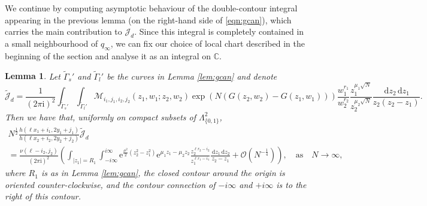 \documentclass[11pt]{article}
\theoremstyle{plain}
\newtheorem{lemma}[theorem]{Lemma}
\theoremstyle{definition}
\numberwithin{equation}{section}
\renewcommand{\d}{\,\mathrm{d}}
\renewcommand{\i}{\mathrm{i}}
\newcommand{\e}{\mathrm{e}}
\begin{document}
%
We continue by computing asymptotic behaviour of the double-contour integral appearing in the previous lemma (on the right-hand side of \eqref{eqn:gcan}), which carries the main contribution to $\mathcal{J}_d$. Since this integral is completely contained in a small neighbourhood of $q_{\infty}$, we can fix our choice of local chart described in the beginning of the section and analyse it as an integral on $\mathbb{C}$. 
%
\begin{lemma}\label{lem:Jdvalue}
Let $\widetilde{\Gamma}_s'$ and $\widetilde{\Gamma}_l'$ be the curves in Lemma \ref{lem:gcan} and denote
\begin{equation}
\mathcal{\widetilde{J}}_d=\frac{1}{(2\pi\i)^2}\int_{\tilde \Gamma_s'}\int_{\tilde \Gamma_l'}
\boldsymbol{\mathcal{M}}_{i_1,j_1,i_2,j_2}(z_1,w_1;z_2,w_2) 
\exp\left({N(G(z_2,w_2)-G(z_1,w_1))}\right)
\frac{w_1^{r_1}}{w_2^{r_2}}
 \frac{z_1^{\mu_1\sqrt{N}}}{z_2^{\mu_2\sqrt{N}}}
 \frac{\d z_2\d z_1}{z_2(z_2-z_1)}.
 \end{equation}
 Then we have that, uniformly on compact subsets of $\Lambda_{\{0,1\}}^2$,
 \begin{multline}
 N^{\frac{1}{2}}
\frac{h(\ell x_1+i_1,2y_1+j_1)}{h(\ell x_2+i_2,2y_2+j_2)}
 \mathcal{\widetilde{J}}_d
 \\=
%
%
\frac{\nu(\ell-i_2,j_2)}{(2\pi\i)^2}\left(
\int_{|z_1|=R_1}
\int_{-i\infty}^{i\infty}
\e^{\frac{\sigma^2}{2}
(z_2^2-z_1^2)}\e^{\mu_1 z_1-\mu_2 z_2}\frac{z_2^{\ell r_2-i_2}}{z_1^{\ell r_1-i_1}}\frac{\d z_1\d z_2}{z_2-z_1}+\mathcal{O}(N^{-\frac{1}{4}})\right),
\quad\text{as}\quad N\rightarrow\infty,
\end{multline}
where $R_1$ is as in Lemma \ref{lem:gcan}, the closed contour around the origin is oriented counter-clockwise, and the contour connection of $-i\infty$ and $+i\infty$ is to the right of this contour. 
%
%
%
%
\end{lemma}
\end{document}
